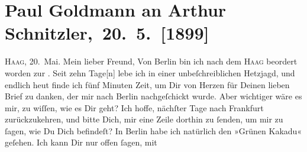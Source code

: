 

         
         \renewcommand{\erwaehntePersonen}{Personen: Paul Goldmann, Alfred Kerr, Theodore Rottenberg}
         \renewcommand{\erwaehnteOrte}{Orte: Berlin, Den Haag, Frankfurt am Main, Frankreich, Wien}
         \renewcommand{\erwaehnteWerke}{Werke: Der grüne Kakadu. Groteske in einem Akt}
               \section[ Paul Goldmann an Arthur Schnitzler, 20. 5. {[}1899{]}]{ Paul Goldmann an Arthur Schnitzler, 20. 5. {[}1899{]}}\nopagebreak{}\rehead{ }\begin{ledgroupsized}[t]{13cm}\normalsize\beginnumbering \toendnotes[C]{\smallbreak\pagebreak[2]} 
\toendnotes[C]{\smallbreak}\pstart
           \raggedleft{}{\pb}\textsc{Haag}, 20. Mai.\pend
           \pstart{}Mein lieber Freund,\pend\pstart
           Von Berlin bin ich nach dem \textsc{Haag} beordert worden zur \label{K_L02875-1v}\label{K_L02875-1h}. Seit zehn Tage{[}n{]} lebe
               ich in einer unbeſchreiblichen Hetzjagd, und endlich heut finde ich fünf Minuten Zeit, um Dir von Herzen für Deinen lieben
               Brief zu danken, der mir nach Berlin
               nachgeſchickt wurde. Aber wichtiger wäre es mir, zu wiſſen, wie es Dir geht? Ich
               hoffe, nächſter Tage nach Frankfurt
               zurückzukehren, und bitte Dich, mir  eine Zeile
               dorthin zu ſenden, um mir zu ſagen, {\pb}wie Du Dich
               befindeſt?\pend
           \pstart
           In Berlin habe ich natürlich den »Grünen Kakadu« geſehen. Ich kann Dir nur offen ſagen, mit

\end{ledgroupsized}
